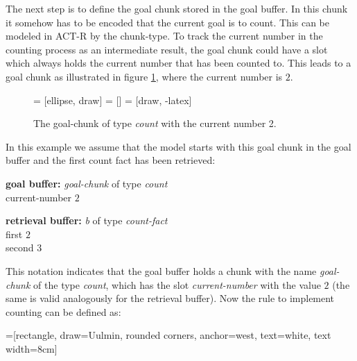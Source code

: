 The next step is to define the goal chunk stored in the goal buffer. In this chunk it somehow has to be encoded that the current goal is to count. This can be modeled in ACT-R by the chunk-type. To track the current number in the counting process as an intermediate result, the goal chunk could have a slot which always holds the current number that has been counted to. This leads to a goal chunk as illustrated in figure \ref{fig:example_counting_goal_chunk}, where the current number is $2$.

\begin{figure}[hbt]
\centering
{} = [ellipse, draw]
 = [] 
 = [draw, -latex]   

\caption{The goal-chunk of type \emph{count} with the current number 2.}
\label{fig:example_counting_goal_chunk}
\end{figure}


In this example we assume that the model starts with this goal chunk in the goal buffer and the first count fact has been retrieved:

\begin{center}
\parbox{17em}{\textbf{goal buffer:} \emph{goal-chunk} of type \emph{count}\\
\noindent\hspace*{15mm} current-number $2$}

\parbox{17em}{\textbf{retrieval buffer:} \emph{b} of type \emph{count-fact}\\
\noindent\hspace*{15mm} first $2$\\
\noindent\hspace*{15mm} second $3$}
\end{center}

This notation indicates that the goal buffer holds a chunk with the name \emph{goal-chunk} of the type \emph{count}, which has the slot \emph{current-number} with the value $2$ (the same is valid analogously for the retrieval buffer). Now the rule to implement counting can be defined as:

=[rectangle, draw=Uulmin,  
        rounded corners, anchor=west, text=white, text width=8cm]

